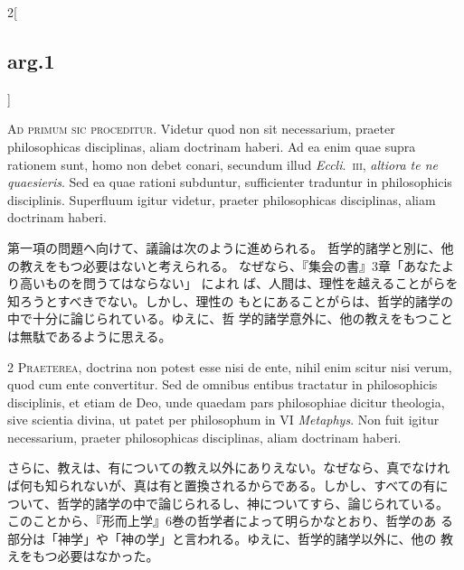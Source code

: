 \documentclass[
paper=a4paper,
fontsize=10pt,
jafontsize=9pt,
titlepage
]{jlreq}
\begin{document}
\begin{paracol}{2}[\subsection{arg.1}]

{\huge A}{\scshape d primum sic proceditur}. Videtur quod non sit
necessarium, praeter philosophicas disciplinas, aliam doctrinam
haberi. Ad ea enim quae supra rationem sunt, homo non debet conari,
secundum illud {\itshape Eccli}.~{\scshape iii}, {\itshape altiora te ne
quaesieris}. Sed ea quae rationi subduntur, sufficienter traduntur in
philosophicis disciplinis. Superfluum igitur videtur, praeter
philosophicas disciplinas, aliam doctrinam haberi.

\switchcolumn

第一項の問題へ向けて、議論は次のように進められる。
哲学的諸学と別に、他の教えをもつ必要はないと考えられる。
なぜなら、『集会の書』3章「あなたより高いものを問うてはならない」 によれ
 ば、人間は、理性を越えることがらを知ろうとすべきでない。しかし、理性の
 もとにあることがらは、哲学的諸学の中で十分に論じられている。ゆえに、哲
 学的諸学意外に、他の教えをもつことは無駄であるように思える。


{\scshape 2 Praeterea}, doctrina non potest esse nisi de ente, nihil
enim scitur nisi verum, quod cum ente convertitur. Sed de omnibus
entibus tractatur in philosophicis disciplinis, et etiam de Deo, unde
quaedam pars philosophiae dicitur theologia, sive scientia divina, ut
patet per philosophum in VI {\itshape Metaphys}. Non fuit igitur
necessarium, praeter philosophicas disciplinas, aliam doctrinam haberi.

\switchcolumn

さらに、教えは、有についての教え以外にありえない。なぜなら、真でなけれ
ば何も知られないが、真は有と置換されるからである。しかし、すべての有に
ついて、哲学的諸学の中で論じられるし、神についてすら、論じられている。
このことから、『形而上学』6巻の哲学者によって明らかなとおり、哲学のあ
る部分は「神学」や「神の学」と言われる。ゆえに、哲学的諸学以外に、他の
教えをもつ必要はなかった。

\switchcolumn*[\subsection{s.c.}]


\end{paracol}
\end{document}
